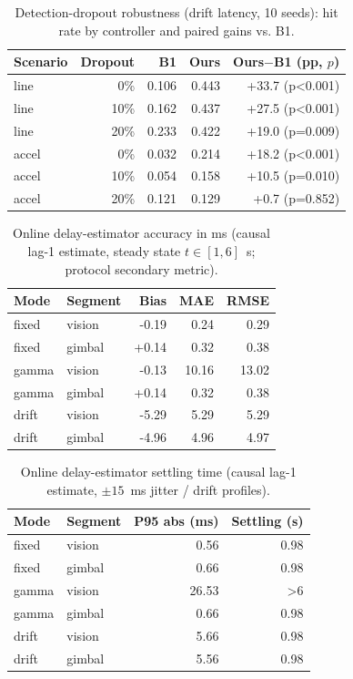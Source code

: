 \documentclass[journal]{IEEEtran}
\begin{document}
\begin{table}[t]\centering\small
\caption{Detection-dropout robustness (drift latency, 10 seeds): hit rate by controller and paired gains vs. B1.}\label{tab:drop}
\begin{tabular}{lrrrr}
\toprule Scenario & Dropout & B1 & Ours & Ours$-$B1 (pp, $p$)\\ \midrule
line & 0\% & 0.106 & 0.443 & +33.7 (p<0.001)\\
line & 10\% & 0.162 & 0.437 & +27.5 (p<0.001)\\
line & 20\% & 0.233 & 0.422 & +19.0 (p=0.009)\\
accel & 0\% & 0.032 & 0.214 & +18.2 (p<0.001)\\
accel & 10\% & 0.054 & 0.158 & +10.5 (p=0.010)\\
accel & 20\% & 0.121 & 0.129 & +0.7 (p=0.852)\\
\bottomrule\end{tabular}\end{table}
\begin{table}[t]\centering\small
\caption{Online delay-estimator accuracy in ms (causal lag-1 estimate, steady state $t\in[1,6]$~s; protocol secondary metric).}\label{tab:de_a}
\begin{tabular}{llrrr}
\toprule Mode & Segment & Bias & MAE & RMSE\\ \midrule
fixed & vision & -0.19 & 0.24 & 0.29\\
fixed & gimbal & +0.14 & 0.32 & 0.38\\
gamma & vision & -0.13 & 10.16 & 13.02\\
gamma & gimbal & +0.14 & 0.32 & 0.38\\
drift & vision & -5.29 & 5.29 & 5.29\\
drift & gimbal & -4.96 & 4.96 & 4.97\\
\bottomrule\end{tabular}\end{table}
\begin{table}[t]\centering\small
\caption{Online delay-estimator settling time (causal lag-1 estimate, $\pm15$~ms jitter / drift profiles).}\label{tab:de_b}
\begin{tabular}{llrr}
\toprule Mode & Segment & P95 abs (ms) & Settling (s)\\ \midrule
fixed & vision & 0.56 & 0.98\\
fixed & gimbal & 0.66 & 0.98\\
gamma & vision & 26.53 & >6\\
gamma & gimbal & 0.66 & 0.98\\
drift & vision & 5.66 & 0.98\\
drift & gimbal & 5.56 & 0.98\\
\bottomrule\end{tabular}\end{table}
\end{document}
